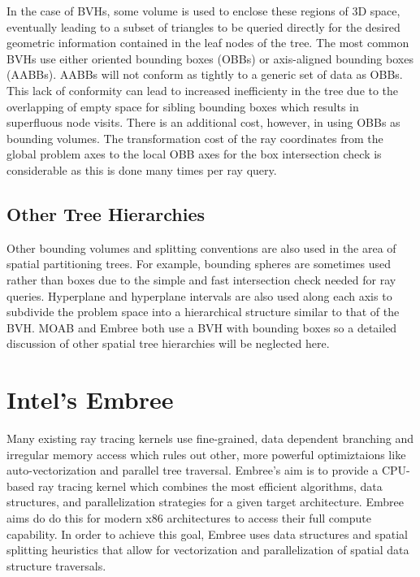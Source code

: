 \documentclass{anstrans}
\begin{document}
In the case of BVHs, some volume is used to enclose these regions of 3D space, eventually leading to a subset of triangles to be queried directly for the desired geometric information contained in the leaf nodes of the tree. The most common BVHs use either oriented bounding boxes (OBBs) or axis-aligned bounding boxes (AABBs). AABBs will not conform as tightly to a generic set of data as OBBs. This lack of conformity can lead to increased inefficienty in the tree due to the overlapping of empty space for sibling bounding boxes which results in superfluous node visits. There is an additional cost, however, in using OBBs as bounding volumes. The transformation cost of the ray coordinates from the global problem axes to the local OBB axes for the box intersection check is considerable as this is done many times per ray query. 

\subsection{Other Tree Hierarchies} 

Other bounding volumes and splitting conventions are also used in the area of spatial partitioning trees. For example, bounding spheres are sometimes used rather than boxes due to the simple and fast intersection check needed for ray queries. Hyperplane and hyperplane intervals are also used along each axis to subdivide the problem space into a hierarchical structure similar to that of the BVH. MOAB and Embree both use a BVH with bounding boxes so a detailed discussion of other spatial tree hierarchies will be neglected here.

\section{Intel's Embree}

Many existing ray tracing kernels use fine-grained, data dependent branching and irregular memory access which rules out other, more powerful optimiztaions like auto-vectorization and parallel tree traversal. Embree's aim is to provide a CPU-based ray tracing kernel which combines the most efficient algorithms, data structures, and parallelization strategies for a given target architecture. Embree aims do do this for modern x86 architectures to access their full compute capability. In order to achieve this goal, Embree uses data structures and spatial splitting heuristics that allow for vectorization and parallelization of spatial data structure traversals. \cite{embree} 
\end{document}
